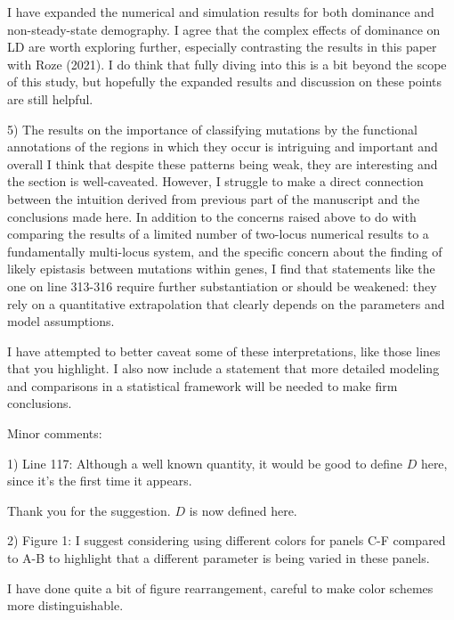 \documentclass{article}
\newenvironment{response}%
  {\list{}{\leftmargin=0.5in\rightmargin=0.5in\color{blue}}\item[]}%
  {\endlist}
\begin{document}
\begin{response}
    I have expanded the numerical and simulation results for both dominance
    and non-steady-state demography. I agree that the complex effects of
    dominance on LD are worth exploring further, especially contrasting the
    results in this paper with Roze (2021). I do think that fully diving into
    this is a bit beyond the scope of this study, but hopefully the expanded
    results and discussion on these points are still helpful.
\end{response}

5) The results on the importance of classifying mutations by the functional
annotations of the regions in which they occur is intriguing and important and
overall I think that despite these patterns being weak, they are interesting
and the section is well-caveated. However, I struggle to make a direct
connection between the intuition derived from previous part of the manuscript
and the conclusions made here. In addition to the concerns raised above to do
with comparing the results of a limited number of two-locus numerical results
to a fundamentally multi-locus system, and the specific concern about the
finding of likely epistasis between mutations within genes, I find that
statements like the one on line 313-316 require further substantiation or
should be weakened: they rely on a quantitative extrapolation that clearly
depends on the parameters and model assumptions.

\begin{response}
    I have attempted to better caveat some of these interpretations, like
    those lines that you highlight. I also now include a statement that more detailed
    modeling and comparisons in a statistical framework will be needed to
    make firm conclusions.
\end{response}


Minor comments:

1) Line 117: Although a well known quantity, it would be good to define $D$
here, since it's the first time it appears.

\begin{response}
    Thank you for the suggestion. $D$ is now defined here.
\end{response}

2) Figure 1: I suggest considering using different colors for panels C-F
compared to A-B to highlight that a different parameter is being varied in
these panels.

\begin{response}
    I have done quite a bit of figure rearrangement, careful to make color schemes
    more distinguishable.
\end{response}
\end{document}
